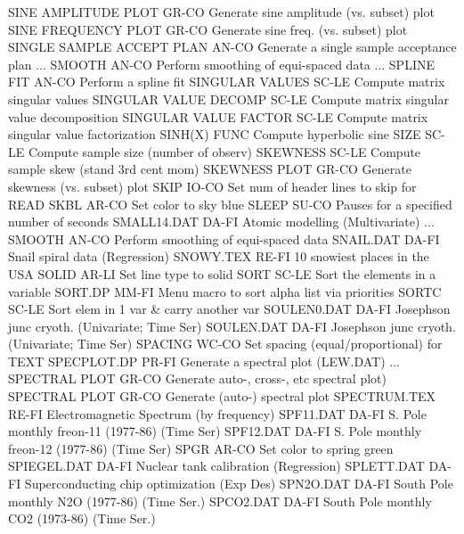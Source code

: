 SINE AMPLITUDE PLOT         GR-CO Generate sine amplitude (vs. subset) plot
SINE FREQUENCY PLOT         GR-CO Generate sine freq. (vs. subset) plot
SINGLE SAMPLE ACCEPT PLAN   AN-CO Generate a single sample acceptance plan
... SMOOTH                  AN-CO Perform smoothing of equi-spaced data
... SPLINE FIT              AN-CO Perform a spline fit
SINGULAR VALUES             SC-LE Compute matrix singular values
SINGULAR VALUE DECOMP       SC-LE Compute matrix singular value decomposition
SINGULAR VALUE FACTOR       SC-LE Compute matrix singular value factorization
SINH(X)                     FUNC  Compute hyperbolic sine
SIZE                        SC-LE Compute sample size (number of observ)
SKEWNESS                    SC-LE Compute sample skew (stand 3rd cent mom)
SKEWNESS PLOT               GR-CO Generate skewness (vs. subset) plot
SKIP                        IO-CO Set num of header lines to skip for READ
SKBL                        AR-CO Set color to sky blue
SLEEP                       SU-CO Pauses for a specified number of seconds
SMALL14.DAT                 DA-FI Atomic modelling (Multivariate)
... SMOOTH                  AN-CO Perform smoothing of equi-spaced data
SNAIL.DAT                   DA-FI Snail spiral data (Regression)
SNOWY.TEX                   RE-FI 10 snowiest places in the USA
SOLID                       AR-LI Set line type to solid
SORT                        SC-LE Sort the elements in a variable
SORT.DP                     MM-FI Menu macro to sort alpha list via priorities
SORTC                       SC-LE Sort elem in 1 var & carry another var
SOULEN0.DAT                 DA-FI Josephson junc cryoth. (Univariate; Time Ser)
SOULEN.DAT                  DA-FI Josephson junc cryoth. (Univariate; Time Ser)
SPACING                     WC-CO Set spacing (equal/proportional) for TEXT
SPECPLOT.DP                 PR-FI Generate a spectral plot (LEW.DAT)
... SPECTRAL PLOT           GR-CO Generate auto-, cross-, etc spectral plot)
SPECTRAL PLOT               GR-CO Generate (auto-) spectral plot
SPECTRUM.TEX                RE-FI Electromagnetic Spectrum (by frequency)
SPF11.DAT                   DA-FI S. Pole monthly freon-11 (1977-86) (Time Ser)
SPF12.DAT                   DA-FI S. Pole monthly freon-12 (1977-86) (Time Ser)
SPGR                        AR-CO Set color to spring green
SPIEGEL.DAT                 DA-FI Nuclear tank calibration (Regression)
SPLETT.DAT                  DA-FI Superconducting chip optimization (Exp Des)
SPN2O.DAT                   DA-FI South Pole monthly N2O (1977-86) (Time Ser.)
SPCO2.DAT                   DA-FI South Pole monthly CO2 (1973-86) (Time Ser.)
